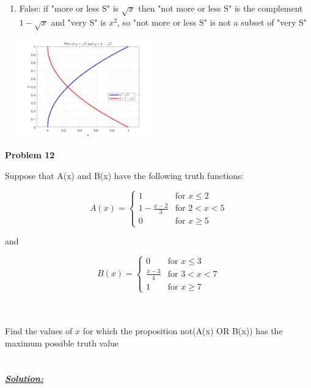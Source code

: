\documentclass{article}
\begin{document}
\begin{enumerate}
  \item False: if "more or less S" is  ${\sqrt{x}}$ then "not more or less S" is the complement ${1-\sqrt{x}}$ and "very S" is ${x^2}$, so "not more or less S" is not a subset of "very S"
  \\ \begin{center} \includegraphics[width=0.45\textwidth]{Problem11_4.png} \end{center}
\end{enumerate}


\newpage
\noindent \textbf{Problem 12}

\noindent Suppose that A(x) and B(x) have the following truth functions: \\
\noindent \newline
\begin{minipage}{0.45\textwidth}
  \[ A(x) = \begin{cases}
      1 & \text{for } x \leq 2 \\
      1 - \frac{x-2}{3} & \text{for } 2 < x < 5 \\
      0 & \text{for } x \geq 5
  \end{cases} \]
\end{minipage}
\hfill and
\begin{minipage}{0.45\textwidth}
  \[ B(x) = \begin{cases}
      0 & \text{for } x \leq 3 \\
      \frac{x-3}{4} & \text{for } 3 < x < 7 \\
      1 & \text{for } x \geq 7
  \end{cases} \]
\end{minipage}

\noindent \newline \\ \\ Find the values of $x$ for which the proposition not(A(x) OR B(x)) has the maximum possible truth value\\ \\ \\
\underline{\textbf{\textit{Solution:}}}
\end{document}
